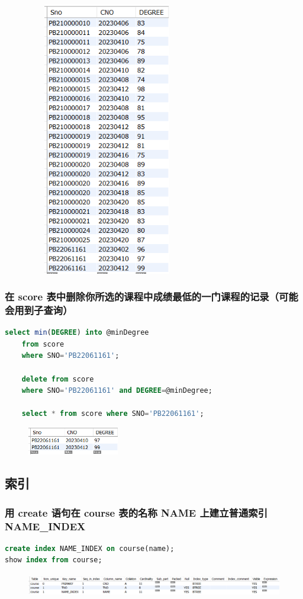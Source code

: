 \documentclass{ctexart}
\begin{document}
	\begin{figure}[H]
		\centering 
		\includegraphics[height=12cm,width=7cm]{17.png}
		\end{figure}
\subsubsection{在 score 表中删除你所选的课程中成绩最低的一门课程的记录（可能会用到子查询）}
\begin{lstlisting}[language=sql]
	select min(DEGREE) into @minDegree    
	from score    
	where SNO='PB22061161';  
	  
	delete from score    
	where SNO='PB22061161' and DEGREE=@minDegree;  
	  
	select * from score where SNO='PB22061161';	
\end{lstlisting}
\begin{figure}[H]
	\centering 
	\includegraphics[height=1.2cm,width=4cm]{18.png}
	\end{figure}
\subsection{索引}
\subsubsection{用 create 语句在 course 表的名称 NAME 上建立普通索引 NAME\_INDEX}
\begin{lstlisting}[language=sql]
create index NAME_INDEX on course(name);
show index from course;
\end{lstlisting}
\begin{figure}[H]
	\centering 
	\includegraphics[height=1cm,width=16cm]{21.png}
	\end{figure}
\end{document}
